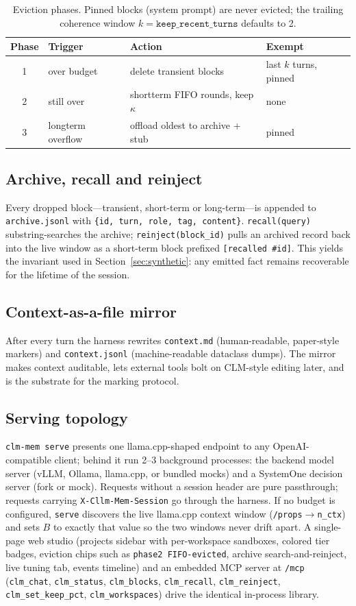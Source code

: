 \documentclass[10pt]{article}
\begin{document}
\begin{table}[htbp]
\centering\small
\begin{tabular}{clll}
\hline
Phase & Trigger & Action & Exempt\\
\hline
1 & over budget & delete transient blocks & last $k$ turns, pinned\\
2 & still over & shortterm FIFO rounds, keep $\kappa$ & none\\
3 & longterm overflow & offload oldest to archive + stub & pinned\\
\hline
\end{tabular}
\caption{Eviction phases. Pinned blocks (system prompt) are never evicted; the trailing coherence window $k=\texttt{keep\_recent\_turns}$ defaults to 2.}\label{tab:phases}
\end{table}

\subsection{Archive, recall and reinject}
Every dropped block---transient, short-term or long-term---is appended to \texttt{archive.jsonl} with \verb|{id, turn, role, tag, content}|. \texttt{recall(query)} substring-searches the archive; \texttt{reinject(block\_id)} pulls an archived record back into the live window as a short-term block prefixed \verb|[recalled #id]|. This yields the invariant used in Section~\ref{sec:synthetic}: any emitted fact remains recoverable for the lifetime of the session.

\subsection{Context-as-a-file mirror}
After every turn the harness rewrites \texttt{context.md} (human-readable, paper-style markers) and \texttt{context.jsonl} (machine-readable dataclass dumps). The mirror makes context auditable, lets external tools bolt on CLM-style editing later, and is the substrate for the marking protocol.

\subsection{Serving topology}
\texttt{clm-mem serve} presents one llama.cpp-shaped endpoint to any OpenAI-compatible client; behind it run 2--3 background processes: the backend model server (vLLM, Ollama, llama.cpp, or bundled mocks) and a SystemOne decision server (fork or mock). Requests without a session header are pure passthrough; requests carrying \verb|X-Cllm-Mem-Session| go through the harness. If no budget is configured, \texttt{serve} discovers the live llama.cpp context window (\texttt{/props}$\to$\texttt{n\_ctx}) and sets $B$ to exactly that value so the two windows never drift apart. A single-page web studio (projects sidebar with per-workspace sandboxes, colored tier badges, eviction chips such as \verb|phase2 FIFO-evicted|, archive search-and-reinject, live tuning tab, events timeline) and an embedded MCP server at \texttt{/mcp} (\texttt{clm\_chat}, \texttt{clm\_status}, \texttt{clm\_blocks}, \texttt{clm\_recall}, \texttt{clm\_reinject}, \texttt{clm\_set\_keep\_pct}, \texttt{clm\_workspaces}) drive the identical in-process library.
\end{document}
